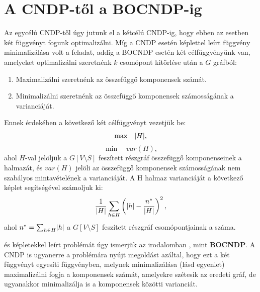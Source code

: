 \section{A CNDP-től a BOCNDP-ig}

Az egycélú CNDP-től úgy jutunk el a kétcélú CNDP-ig, hogy ebben az esetben két függvényt fogunk optimalizálni.
Míg a CNDP esetén  képlettel leírt függvény minimalizálása volt a feladat,
addig a BOCNDP esetén két célfüggvényünk van, amelyeket optimalizálni szeretnénk $k$ csomópont kitörlése után a $G$ gráfból:
\begin{enumerate}
  \item Maximalizálni szeretnénk az összefüggő komponensek számát.
  \item Minimalizálni szeretnénk az összefüggő komponensek számosságának a varianciáját.
\end{enumerate}

Ennek érdekében a következő két célfüggvényt vezetjük be:
\begin{equation}\label{eqn:MAX_CONNECTED_COMPONENTS}
  \max \quad \lvert H\rvert,
\end{equation}
\begin{equation}\label{eqn:MIN_CARDINALITY_VARIANCE_COMPONENTS}
  \min \quad var(H),
\end{equation}
ahol $H$-val jelöljük a $G\left[ V \setminus S \right]$ feszített részgráf összefüggő komponenseinek a halmazát,
és $var(H)$ jelöli az összefüggő komponensek számosságának nem szabályos mintavételének a varianciáját.
A H halmaz varianciáját a következő képlet segítségével számoljuk ki:
\begin{equation}\label{eqn:CARDINALITY_VARIANCE_COMPONENTS}
  \dfrac{1}{ \lvert H\rvert } \sum_{h \in H} \left( \lvert h\rvert - \dfrac{ n^{*} }{ \lvert H\rvert } \right)^{2},
\end{equation}
ahol $n^{*} = \sum_{h \in H} \lvert h\rvert$ a $G\left[ V \setminus S \right]$ feszített részgráf csomópontjainak a száma.

 és 
képletekkel leírt problémát úgy ismerjük az irodalomban \cite{ventresca2018bi}, mint \textbf{BOCNDP}.
A CNDP is ugyanerre a problémára nyújt megoldást azáltal,
hogy ezt a két függvényt egyesíti  függvényben,
melynek minimalizálása (lásd  egyenlet) maximalizálni fogja a komponensek számát, amelyekre szétesik az eredeti gráf,
de ugyanakkor minimalizálja is a komponensek közötti varianciát.

